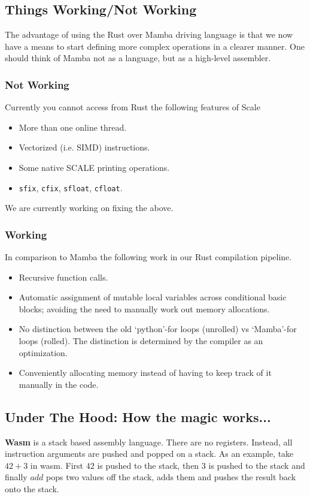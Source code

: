 \subsection{Things Working/Not Working}
The advantage of using the Rust over Mamba driving language is that we now
have a means to start defining more complex operations in a clearer manner.
One should think of Mamba not as a language, but as a high-level assembler.

\subsubsection{Not Working}
Currently you cannot access from Rust the following features of Scale
\begin{itemize}
     \item More than one online thread.
     \item Vectorized (i.e. SIMD) instructions.
     \item Some native SCALE printing operations.
     \item \verb|sfix|, \verb|cfix|, \verb|sfloat|, \verb|cfloat|.
\end{itemize}
We are currently working on fixing the above.

\subsubsection{Working}
In comparison to Mamba the following work in our Rust compilation pipeline.
\begin{itemize}
     \item Recursive function calls.
     \item Automatic assignment of mutable local variables across
	     conditional basic blocks; avoiding the need to manually
	     work out memory allocations.
     \item No distinction between the old `python'-for loops (unrolled)
	     vs `Mamba'-for loops (rolled). The distinction is determined
	   by the compiler as an optimization.
     \item Conveniently allocating memory instead of having to keep 
	   track of it manually in the code.
\end{itemize}


\subsection{Under The Hood: How the magic works...}

\noindent
{\bf{Wasm}} is a stack based assembly language.
There are no registers. Instead, all instruction arguments are pushed and popped on a stack.
As an example, take $42 + 3$ in wasm. First $42$ is pushed to the stack, then $3$ is pushed to the
stack and finally $add$ pops two values off the stack, adds them and pushes the result back onto the stack.

